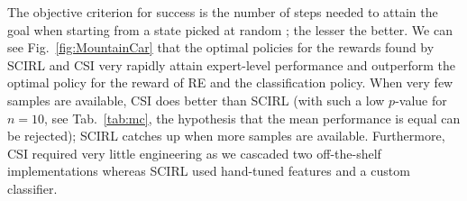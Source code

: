 \documentclass{llncs}
\providecommand{\e}[1]{\ensuremath{\times 10^{#1}}}
\begin{document}
The objective criterion for success is the number of steps needed to attain the goal when starting from a state picked at random ; the lesser the better. We can see Fig.~\ref{fig:MountainCar} that the optimal policies for the rewards found by SCIRL and CSI very rapidly attain expert-level performance and outperform the optimal policy for the reward of RE and the classification policy. When very few samples are available, CSI does better than SCIRL (with such a low $p$-value for $n=10$, see Tab.~\ref{tab:mc}, the hypothesis that the mean performance is equal can be rejected); SCIRL catches up when more samples are available. Furthermore, CSI required very little engineering as we cascaded two off-the-shelf implementations whereas SCIRL used hand-tuned features and a custom classifier.
\begin{table}
  \small
  \hfill
  \caption{Student or Welch test of mean equality (depending on wether a Bartlett test of variance equality succeeds) $p$-values for CSI and SCIRL on the mountain car (\ref{tab:mc}) and the highway driving simulator (\ref{tab:highway}). High values ($>1.0\e{-02}$) means that the hypothesis that the means are equal cannot be rejected.}
\end{table}
\end{document}
